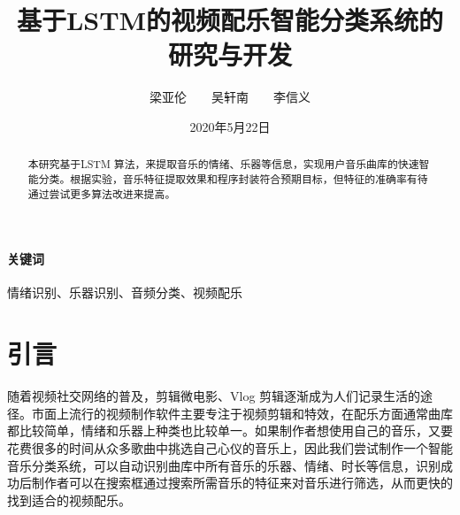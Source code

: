 \documentclass[a4paper,utf8,10pt]{article}
\title{基于LSTM的视频配乐智能分类系统的研究与开发}
\author{梁亚伦　　吴轩南　　李信义}
\date{2020年5月22日}
\begin{document}
\maketitle

\begin{abstract}
本研究基于LSTM 算法，来提取音乐的情绪、乐器等信息，实现用户音乐曲库的快速智能分类。根据实验，音乐特征提取效果和程序封装符合预期目标，但特征的准确率有待通过尝试更多算法改进来提高。
\end{abstract}

\paragraph{关键词} 情绪识别、乐器识别、音频分类、视频配乐
\vspace{\baselineskip}

\section{引言}

随着视频社交网络的普及，剪辑微电影、Vlog 剪辑逐渐成为人们记录生活的途径。市面上流行的视频制作软件主要专注于视频剪辑和特效，在配乐方面通常曲库都比较简单，情绪和乐器上种类也比较单一。如果制作者想使用自己的音乐，又要花费很多的时间从众多歌曲中挑选自己心仪的音乐上，因此我们尝试制作一个智能音乐分类系统，可以自动识别曲库中所有音乐的乐器、情绪、时长等信息，识别成功后制作者可以在搜索框通过搜索所需音乐的特征来对音乐进行筛选，从而更快的找到适合的视频配乐。
\end{document}
